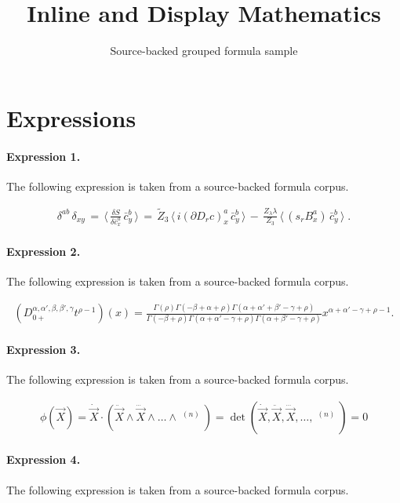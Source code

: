 \documentclass[11pt]{article}
\title{Inline and Display Mathematics}
\author{Source-backed grouped formula sample}
\date{}
\begin{document}
\maketitle
\section{Expressions}
\paragraph{Expression 1.} The following expression is taken from a source-backed formula corpus.

\begin{align*} \delta^{ab} \, \delta_{xy}\, =\, \langle \, \frac{\delta S}{\delta\bar c^a_x} \, \bar c^b_y\, \rangle\, =\, \widetilde Z_3 \, \langle \, i (\partial D_r c)^a_x \, \bar c^b_y\, \rangle \, - \,\frac{Z_\lambda \lambda }{Z_3} \,\langle \, (s_r B^a_x ) \, \bar c^b_y\, \rangle \; .\end{align*}

\paragraph{Expression 2.} The following expression is taken from a source-backed formula corpus.

\begin{align*}\left(D_{0+}^{\alpha,\alpha',\beta,\beta',\gamma}t^{\rho-1}\right)(x)=\frac{\Gamma(\rho)\Gamma(-\beta+\alpha+\rho)\Gamma(\alpha+\alpha'+\beta'-\gamma+\rho)}{\Gamma(-\beta+\rho)\Gamma(\alpha+\alpha'-\gamma+\rho)\Gamma(\alpha+\beta'-\gamma+\rho)}x^{\alpha+\alpha'-\gamma+\rho-1}.\end{align*}

\paragraph{Expression 3.} The following expression is taken from a source-backed formula corpus.

\begin{align*} \phi ( {\vec {X}} ) = \dot { \vec{X} } \cdot ( {\ddot {\vec {X}} \wedge \dddot{\vec {X}}\wedge \ldots\wedge \mathop {\vec {X}}\limits^{\left( n \right)} } ) = \det( {\dot {\vec {X}},\ddot {\vec {X}}, \dddot{\vec {X}},\ldots ,\mathop{\vec {X}}\limits^{\left( n \right)} } ) = 0\end{align*}

\paragraph{Expression 4.} The following expression is taken from a source-backed formula corpus.
\end{document}

